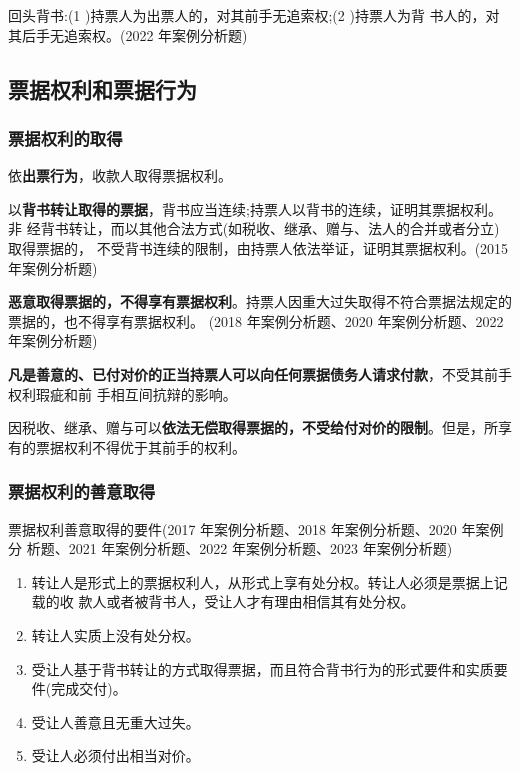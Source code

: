 \documentclass[UTF8,12pt]{ctexart}
\numberwithin{equation}{section} %
\numberwithin{figure}{section}
\numberwithin{table}{section}
\begin{document}
	回头背书:(1 )持票人为出票人的，对其前手无追索权;(2 )持票人为背 书人的，对其后手无追索权。(2022 年案例分析题)
	
	\subsection{票据权利和票据行为}
	
	\subsubsection{票据权利的取得}
	依\textbf{出票行为}，收款人取得票据权利。
	
	以\textbf{背书转让取得的票据}，背书应当连续;持票人以背书的连续，证明其票据权利。非 经背书转让，而以其他合法方式(如税收、继承、赠与、法人的合并或者分立)取得票据的， 不受背书连续的限制，由持票人依法举证，证明其票据权利。(2015 年案例分析题)
	
	\textbf{恶意取得票据的，不得享有票据权利}。持票人因重大过失取得不符合票据法规定的票据的，也不得享有票据权利。 (2018 年案例分析题、2020 年案例分析题、2022 年案例分析题)
	
	\textbf{凡是善意的、已付对价的正当持票人可以向任何票据债务人请求付款}，不受其前手权利瑕疵和前 手相互间抗辩的影响。
	
	因税收、继承、赠与可以\textbf{依法无偿取得票据的，不受给付对价的限制}。但是，所享有的票据权利不得优于其前手的权利。
	 
	\subsubsection{票据权利的善意取得}
	票据权利善意取得的要件(2017 年案例分析题、2018 年案例分析题、2020 年案例分 析题、2021 年案例分析题、2022 年案例分析题、2023 年案例分析题)
	\begin{enumerate}
		\item 转让人是形式上的票据权利人，从形式上享有处分权。转让人必须是票据上记载的收 款人或者被背书人，受让人才有理由相信其有处分权。
		
		\item 转让人实质上没有处分权。
		
		\item 受让人基于背书转让的方式取得票据，而且符合背书行为的形式要件和实质要件(完成交付)。
		
		\item 受让人善意且无重大过失。
		
		\item 受让人必须付出相当对价。
	\end{enumerate} 
\end{document}
